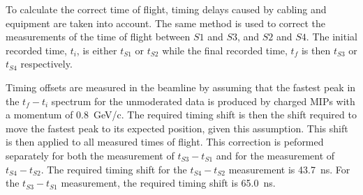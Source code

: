 To calculate the correct time of flight, timing delays caused by cabling and equipment are taken into account.
The same method is used to correct the measurements of the time of flight between $\mathit{S1}$ and $\mathit{S3}$, and $\mathit{S2}$ and $\mathit{S4}$.
The initial recorded time, $t_i$, is either $t_{\mathit{S1}}$ or $t_{\mathit{S2}}$ while the final recorded time, $t_f$ is then $t_{\mathit{S3}}$ or $t_{\mathit{S4}}$ respectively.

Timing offsets are measured in the beamline by assuming that the fastest peak in the $t_{f}-t_{i}$ spectrum for the unmoderated data is produced by charged MIPs with a momentum of 0.8~GeV/c.
The required timing shift is then the shift required to move the fastest peak to its expected position, given this assumption.
This shift is then applied to all measured times of flight.
This correction is peformed separately for both the measurement of $t_{\mathit{S3}}-t_{\mathit{S1}}$ and for the measurement of $t_{\mathit{S4}}-t_{\mathit{S2}}$.
The required timing shift for the $t_{\mathit{S4}}-t_{\mathit{S2}}$ measurement is 43.7~ns.
For the $t_{\mathit{S3}}-t_{\mathit{S1}}$ measurement, the required timing shift is 65.0~ns.



